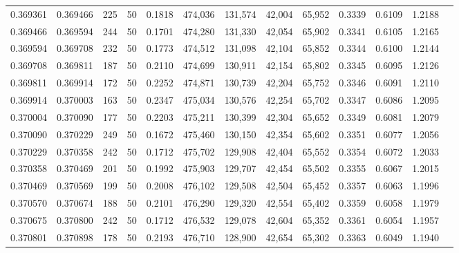 \begin{tabular}{rrrrrrrrrrrrr}
0.369361 & 0.369466 &   225 &  50 &                                     0.1818 & 474,036 & 131,574 &  42,004 &  65,952 & 0.3339 & 0.6109 & 1.2188 \\
0.369466 & 0.369594 &   244 &  50 &                                     0.1701 & 474,280 & 131,330 &  42,054 &  65,902 & 0.3341 & 0.6105 & 1.2165 \\
0.369594 & 0.369708 &   232 &  50 &                                     0.1773 & 474,512 & 131,098 &  42,104 &  65,852 & 0.3344 & 0.6100 & 1.2144 \\
0.369708 & 0.369811 &   187 &  50 &                                     0.2110 & 474,699 & 130,911 &  42,154 &  65,802 & 0.3345 & 0.6095 & 1.2126 \\
0.369811 & 0.369914 &   172 &  50 &                                     0.2252 & 474,871 & 130,739 &  42,204 &  65,752 & 0.3346 & 0.6091 & 1.2110 \\
0.369914 & 0.370003 &   163 &  50 &                                     0.2347 & 475,034 & 130,576 &  42,254 &  65,702 & 0.3347 & 0.6086 & 1.2095 \\
0.370004 & 0.370090 &   177 &  50 &                                     0.2203 & 475,211 & 130,399 &  42,304 &  65,652 & 0.3349 & 0.6081 & 1.2079 \\
0.370090 & 0.370229 &   249 &  50 &                                     0.1672 & 475,460 & 130,150 &  42,354 &  65,602 & 0.3351 & 0.6077 & 1.2056 \\
0.370229 & 0.370358 &   242 &  50 &                                     0.1712 & 475,702 & 129,908 &  42,404 &  65,552 & 0.3354 & 0.6072 & 1.2033 \\
0.370358 & 0.370469 &   201 &  50 &                                     0.1992 & 475,903 & 129,707 &  42,454 &  65,502 & 0.3355 & 0.6067 & 1.2015 \\
0.370469 & 0.370569 &   199 &  50 &                                     0.2008 & 476,102 & 129,508 &  42,504 &  65,452 & 0.3357 & 0.6063 & 1.1996 \\
0.370570 & 0.370674 &   188 &  50 &                                     0.2101 & 476,290 & 129,320 &  42,554 &  65,402 & 0.3359 & 0.6058 & 1.1979 \\
0.370675 & 0.370800 &   242 &  50 &                                     0.1712 & 476,532 & 129,078 &  42,604 &  65,352 & 0.3361 & 0.6054 & 1.1957 \\
0.370801 & 0.370898 &   178 &  50 &                                     0.2193 & 476,710 & 128,900 &  42,654 &  65,302 & 0.3363 & 0.6049 & 1.1940 \\

\end{tabular}
